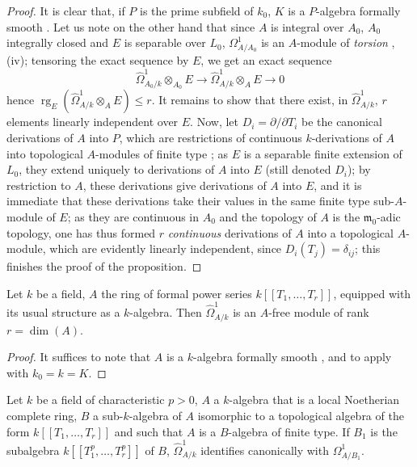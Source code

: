 \begin{proof}
It is clear that, if $P$ is the prime subfield of $k_0$, $K$ is a $P$-algebra formally smooth .
Let us note on the other hand that since $A$ is integral over $A_0$, $A_0$ integrally closed and $E$ is separable over $L_0$, $\Omega^1_{A/A_0}$ is an $A$-module of \emph{torsion} , (iv); tensoring the exact sequence  by $E$, we get an exact sequence
\[
  \widehat{\Omega}^1_{A_0/k}\otimes_{A_0} E\to\widehat{\Omega}^1_{A/k}\otimes_A E\to 0
\]
hence $\operatorname{rg}_E(\widehat{\Omega}^1_{A/k}\otimes_A E)\leqslant r$.
It remains to show that there exist, in $\widehat{\Omega}^1_{A/k}$, $r$ elements linearly independent over $E$.
Now, let $D_i=\partial/\partial T_i$ be the canonical derivations of $A$ into $P$, which are restrictions of continuous $k$-derivations of $A$ into topological $A$-modules of finite type ;
as $E$ is a separable finite extension of $L_0$, they extend uniquely to derivations of $A$ into $E$ (still denoted $D_i$); by restriction to $A$, these derivations give derivations of $A$ into $E$, and it is immediate that these derivations take their values in the same finite type sub-$A$-module of $E$; as they are continuous in $A_0$ and the topology of $A$ is the $\mathfrak{m}_0$-adic topology, one has thus formed $r$ \emph{continuous} derivations of $A$ into a topological $A$-module, which are evidently linearly independent, since $D_i(T_j)=\delta_{ij}$; this finishes the proof of the proposition.
\end{proof}

\begin{corollary}[21.9.3]
\label{0.21.9.3}
Let $k$ be a field, $A$ the ring of formal power series $k[[T_1,\ldots,T_r]]$, equipped with its usual structure as a $k$-algebra.
Then $\widehat{\Omega}^1_{A/k}$ is an $A$-free module of rank $r=\dim(A)$.
\end{corollary}

\begin{proof}
It suffices to note that $A$ is a $k$-algebra formally smooth , and to apply  with $k_0=k=K$.
\end{proof}

\begin{lemma}[21.9.4]
\label{0.21.9.4}
Let $k$ be a field of characteristic $p>0$, $A$ a $k$-algebra that is a local Noetherian complete ring, $B$ a sub-$k$-algebra of $A$ isomorphic to a topological algebra of the form $k[[T_1,\ldots,T_r]]$ and such that $A$ is a $B$-algebra of finite type.
If $B_1$ is the subalgebra $k[[T_1^p,\ldots,T_r^p]]$ of $B$, $\widehat{\Omega}^1_{A/k}$ identifies canonically with $\Omega^1_{A/B_1}$.
\end{lemma}

